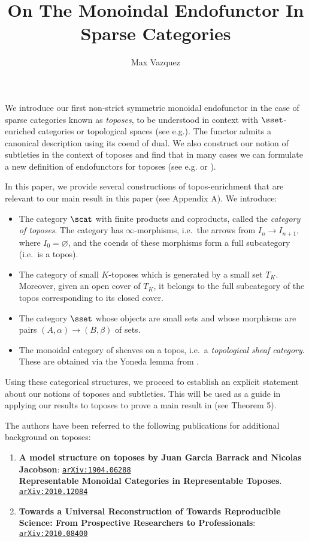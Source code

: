 \documentclass[a4paper,reqno,oneside]{article}
\begin{document}
\title{On The Monoindal Endofunctor In Sparse Categories}
\author{Max Vazquez}
\maketitle


We introduce our first non-strict symmetric monoidal endofunctor in the case of sparse categories known as \textit{toposes}, to be understood in context with $\sset$-enriched categories or topological spaces (see e.g.\~\cite{Jacobs2016}). The functor admits a canonical description using its coend of dual. We also construct our notion of subtleties in the context of toposes and find that in many cases we can formulate a new definition of endofunctors for toposes (see e.g.\~\cite{Bourke2023} or \cite{Savage2017,Bourke2022}). 

In this paper, we provide several constructions of topos-enrichment that are relevant to our main result in this paper (see Appendix A). We introduce:
\begin{itemize}
    \item The category $\scat$ with finite products and coproducts, called the \textit{category of toposes}. The category has $\infty$-morphisms, i.e.\ the arrows from $I_n\to I_{n+1}$, where $I_0=\varnothing$, and the coends of these morphisms form a full subcategory (i.e.\ is a topos).
    \item The category of small $K$-toposes which is generated by a small set $T_K$. Moreover, given an open cover of $T_K$, it belongs to the full subcategory of the topos corresponding to its closed cover.
    \item The category $\sset$ whose objects are small sets and whose morphisms are pairs $(A,\alpha)\to (B,\beta)$ of sets. 
    \item The monoidal category of sheaves on a topos, i.e.\ a \textit{topological sheaf category}. These are obtained via the Yoneda lemma from \cite[Section 5.8]{Rozenblyk2003}.
\end{itemize}
Using these categorical structures, we proceed to establish an explicit statement about our notions of toposes and subtleties. This will be used as a guide in applying our results to toposes to prove a main result in \cite{Jacobs2016} (see Theorem 5). 



The authors have been referred to the following publications for additional background on toposes:
\begin{enumerate}
    \item \textbf{A model structure on toposes by Juan Garcia Barrack and Nicolas Jacobson}: \href{https://arxiv.org/abs/1904.06288}{\tt arXiv:1904.06288} \\
    \textbf{Representable Monoidal Categories in Representable Toposes}. \href{https://arxiv.org/abs/2010.12084}{\tt arXiv:2010.12084}

    \item \textbf{Towards a Universal Reconstruction of Towards Reproducible Science: From Prospective Researchers to Professionals}: \href{https://arxiv.org/abs/2010.08400}{\tt arXiv:2010.08400}

\end{enumerate}
\end{document}
